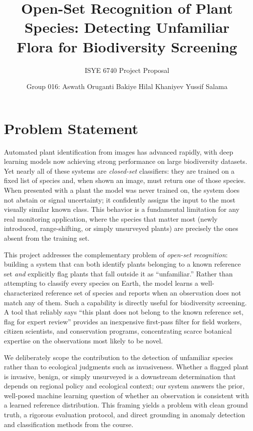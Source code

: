 \documentclass[11pt]{article}
\title{Open-Set Recognition of Plant Species: Detecting Unfamiliar Flora for Biodiversity Screening}
\author{ISYE 6740 Project Proposal}
\date{Group 016: Aswath Oruganti \quad Bakiye Hilal Khaniyev \quad Yussif Salama}
\begin{document}
\maketitle

\section{Problem Statement}

Automated plant identification from images has advanced rapidly, with deep learning models now achieving strong performance on large biodiversity datasets. Yet nearly all of these systems are \emph{closed-set} classifiers: they are trained on a fixed list of species and, when shown an image, must return one of those species. When presented with a plant the model was never trained on, the system does not abstain or signal uncertainty; it confidently assigns the input to the most visually similar known class. This behavior is a fundamental limitation for any real monitoring application, where the species that matter most (newly introduced, range-shifting, or simply unsurveyed plants) are precisely the ones absent from the training set.

This project addresses the complementary problem of \emph{open-set recognition}: building a system that can both identify plants belonging to a known reference set \emph{and} explicitly flag plants that fall outside it as ``unfamiliar.'' Rather than attempting to classify every species on Earth, the model learns a well-characterized reference set of species and reports when an observation does not match any of them. Such a capability is directly useful for biodiversity screening. A tool that reliably says ``this plant does not belong to the known reference set, flag for expert review'' provides an inexpensive first-pass filter for field workers, citizen scientists, and conservation programs, concentrating scarce botanical expertise on the observations most likely to be novel.

We deliberately scope the contribution to the detection of unfamiliar species rather than to ecological judgments such as invasiveness. Whether a flagged plant is invasive, benign, or simply unsurveyed is a downstream determination that depends on regional policy and ecological context; our system answers the prior, well-posed machine learning question of whether an observation is consistent with a learned reference distribution. This framing yields a problem with clean ground truth, a rigorous evaluation protocol, and direct grounding in anomaly detection and classification methods from the course.
\end{document}
